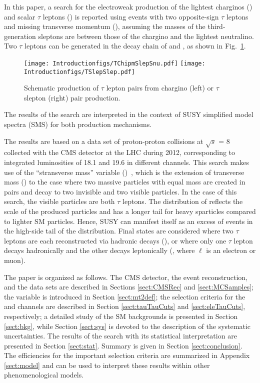 In this paper, a search for the electroweak production of the lightest charginos (\chione) and scalar $\tau$  leptons (\stau) is reported using events 
with two opposite-sign $\tau$ leptons and 
missing transverse momentum (\MPT), assuming the masses of the third-generation sleptons are between those of the 
chargino and the lightest neutralino. 
Two $\tau$ leptons can be generated in the decay chain of \chione and \sTau, as shown in Fig.~\ref{fig:Productions}. 
\begin{figure}[!htb]
\centering
\texttt{[image: Introductionfigs/TChipmSlepSnu.pdf]}
\texttt{[image: Introductionfigs/TSlepSlep.pdf]}

\caption{Schematic production of $\tau$ lepton pairs from chargino (left) or $\tau$ slepton (right) pair production.}
\label{fig:Productions}
\end{figure}
The results of the search are interpreted in the context of SUSY simplified model spectra (SMS) \cite{Alwall:2008ag,alves:sms} for both
production mechanisms.


The results are based on a data set of proton-proton 
collisions at $\sqrt{s}$ = 8\TeV
collected with the CMS detector at the LHC during 2012, corresponding to integrated
luminosities of 18.1 and 19.6 \invfb in different channels. 
This search makes use of the ``stransverse mass'' variable (\mttwo)~\cite{Lester:1999tx,Barr:2003rg},
which is the extension of transverse mass (\mt) to the case 
where two massive particles with equal mass are created in pairs  
and decay to two invisible and two visible particles. 
In the case of this search, the visible particles are both $\tau$ leptons.
The distribution of \mttwo reflects the scale of the produced particles and has a longer tail for heavy sparticles
compared to lighter SM particles. Hence, SUSY 
can manifest itself
as an excess of events in the high-side tail of the \mttwo distribution. 
Final states are considered where
two $\tau$ leptons are each reconstructed via hadronic decays (\tauTau), 
or where only one $\tau$ lepton  decays hadronically and 
the other decays leptonically (\leptonTau, where $\ell$ is an electron or muon). 

The paper is organized as follows.  The CMS detector, the event reconstruction, and the data sets are described
in Sections \ref{sect:CMSRec} and \ref{sect:MCSamples}; the \mttwo variable is introduced in Section \ref{sect:mt2def}; 
the selection criteria for the \tauTau and \leptonTau channels are described in Section \ref{sect:tauTauCuts} and \ref{sect:eleTauCuts}, respectively;
a detailed study of the SM backgrounds is presented in Section \ref{sect:bkg}, while Section \ref{sect:sys} 
is devoted to the description of the systematic uncertainties.  The results of the search with its statistical interpretation are presented in 
Section \ref{sect:stat}. Summary is given in Section \ref{sect:conclusion}. The efficiencies for the important selection criteria are summarized in Appendix \ref{sect:model} and can be used to interpret these results within other phenomenological models. 




